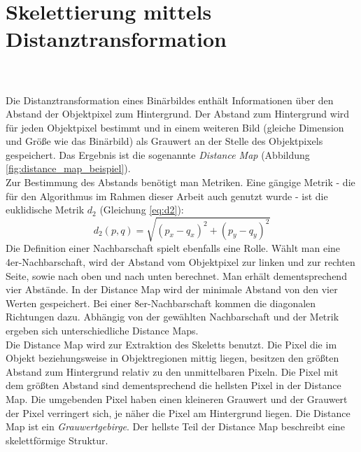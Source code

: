 \section{Skelettierung mittels Distanztransformation}
\\\\
Die Distanztransformation eines Binärbildes enthält Informationen über den Abstand der Objektpixel zum Hintergrund. Der Abstand zum Hintergrund wird für jeden Objektpixel bestimmt und in einem
weiteren Bild (gleiche Dimension und Größe wie das Binärbild) als Grauwert an der Stelle des Objektpixels gespeichert. Das Ergebnis ist die sogenannte \emph{Distance Map} (Abbildung \ref{fig:distance_map_beispiel}). \\
Zur Bestimmung des Abstands benötigt man Metriken. Eine gängige Metrik - die für den Algorithmus im Rahmen dieser Arbeit auch genutzt wurde - ist die euklidische Metrik $d_2$ (Gleichung \ref{eq:d2}):
\begin{equation}
\label{eq:d2}
d_2(p,q) = \sqrt{(p_x - q_x)^2 + (p_y - q_y)^2}  
\end{equation}
Die Definition einer Nachbarschaft spielt
ebenfalls eine Rolle. Wählt man eine
4er-Nachbarschaft, wird der Abstand vom Objektpixel zur linken und zur rechten Seite, sowie nach oben und nach unten berechnet. Man erhält dementsprechend
vier Abstände. In der Distance Map wird der minimale Abstand von den vier Werten gespeichert. Bei einer 8er-Nachbarschaft
kommen die diagonalen Richtungen dazu. Abhängig von der gewählten
Nachbarschaft und der Metrik ergeben sich unterschiedliche Distance
Maps.\\
Die Distance Map wird zur Extraktion des Skeletts benutzt. Die
Pixel die im Objekt beziehungsweise in Objektregionen mittig liegen, besitzen den größten Abstand zum Hintergrund relativ zu den unmittelbaren Pixeln. Die Pixel mit dem größten Abstand sind dementsprechend die hellsten Pixel in der Distance Map. Die umgebenden Pixel haben einen kleineren Grauwert und der Grauwert der Pixel verringert sich, je näher die Pixel am Hintergrund liegen. Die Distance Map ist ein \emph{Grauwertgebirge}. Der hellste
Teil der Distance Map beschreibt eine skelettförmige Struktur.
\label{sec:distanztransformation}
